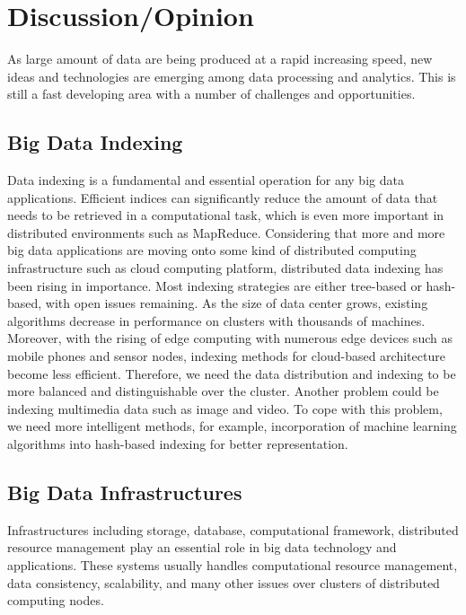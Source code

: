\documentclass[conference]{IEEEtran}
\begin{document}
\hypertarget{discussionopinion}{%
\section{Discussion/Opinion}\label{discussionopinion}}

As large amount of data are being produced at a rapid increasing speed,
new ideas and technologies are emerging among data processing and
analytics. This is still a fast developing area with a number of
challenges and opportunities.

\hypertarget{big-data-indexing-1}{%
\subsection{Big Data Indexing}\label{big-data-indexing-1}}

Data indexing is a fundamental and essential operation for any big data
applications. Efficient indices can significantly reduce the amount of
data that needs to be retrieved in a computational task, which is even
more important in distributed environments such as MapReduce.
Considering that more and more big data applications are moving onto
some kind of distributed computing infrastructure such as cloud
computing platform, distributed data indexing has been rising in
importance. Most indexing strategies are either tree-based or
hash-based, with open issues remaining. As the size of data center
grows, existing algorithms decrease in performance on clusters with
thousands of machines. Moreover, with the rising of edge computing with
numerous edge devices such as mobile phones and sensor nodes, indexing
methods for cloud-based architecture become less efficient. Therefore,
we need the data distribution and indexing to be more balanced and
distinguishable over the cluster. Another problem could be indexing
multimedia data such as image and video. To cope with this problem, we
need more intelligent methods, for example, incorporation of machine
learning algorithms into hash-based indexing for better representation.

\hypertarget{big-data-infrastructures-1}{%
\subsection{Big Data Infrastructures}\label{big-data-infrastructures-1}}

Infrastructures including storage, database, computational framework,
distributed resource management play an essential role in big data
technology and applications. These systems usually handles computational
resource management, data consistency, scalability, and many other
issues over clusters of distributed computing nodes.
\end{document}
